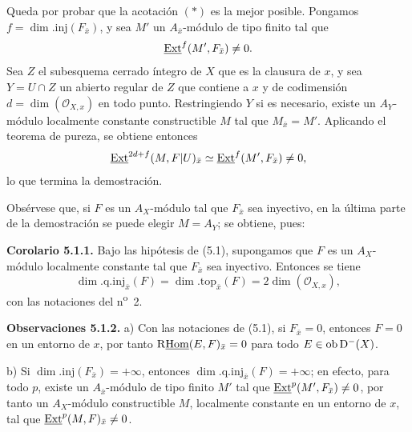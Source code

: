 Queda por probar que la acotación $(*)$ es la mejor posible. Pongamos $f=\dim.\mathrm{inj}(F_{\bar{x}})$, y sea $M'$ un $A_{\bar{x}}$-módulo de tipo finito tal que
\[
        \underline{\operatorname{Ext}}^f(M',F_{\bar{x}})\neq0.
\]
Sea $Z$ el subesquema cerrado íntegro de $X$ que es la clausura de $x$, y sea $Y=U\cap Z$ un abierto regular de $Z$ que contiene a $x$ y de codimensión $d=\dim(\mathcal{O}_{X,x})$ en todo punto. Restringiendo $Y$ si es necesario, existe un $A_Y$-módulo localmente constante constructible $M$ tal que $M_{\bar{x}}=M'$. Aplicando el teorema de pureza, se obtiene entonces
\[
        \underline{\operatorname{Ext}}^{2d+f}(M,F|U)_{\bar{x}}\simeq \underline{\operatorname{Ext}}^f(M',F_{\bar{x}})\neq0,
\]
lo que termina la demostración.

Obsérvese que, si $F$ es un $A_X$-módulo tal que $F_{\bar{x}}$ sea inyectivo, en la última parte de la demostración se puede elegir $M=A_Y$; se obtiene, pues:

\textbf{Corolario 5.1.1.} Bajo las hipótesis de (5.1), supongamos que $F$ es un $A_X$-módulo localmente constante tal que $F_{\bar{x}}$ sea inyectivo. Entonces se tiene
\[
        \dim.\mathrm{q.inj}_{\bar{x}}(F)=\dim.\mathrm{top}_{\bar{x}}(F)=2\dim(\mathcal{O}_{X,x}),
\]
con las notaciones del n\textsuperscript{o}~2.

\textbf{Observaciones 5.1.2.} a) Con las notaciones de (5.1), si $F_{\bar{x}}=0$, entonces $F=0$ en un entorno de $x$, por tanto $\mathrm{R}\underline{\operatorname{Hom}}(E,F)_{\bar{x}}=0$ para todo $E\in\operatorname{ob}\mathrm{D}^{-}(X)$.

b) Si $\dim.\mathrm{inj}(F_{\bar{x}})=+\infty$, entonces $\dim.\mathrm{q.inj}_{\bar{x}}(F)=+\infty$; en efecto, para todo $p$, existe un $A_{\bar{x}}$-módulo de tipo finito $M'$ tal que $\underline{\operatorname{Ext}}^p(M',F_{\bar{x}})\neq0$, por tanto un $A_X$-módulo constructible $M$, localmente constante en un entorno de $x$, tal que $\underline{\operatorname{Ext}}^p(M,F)_{\bar{x}}\neq0$.
